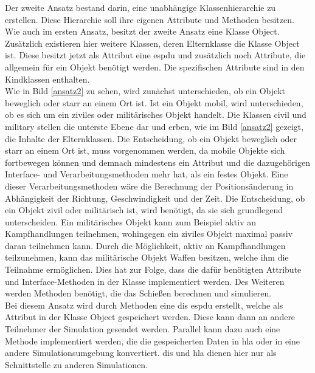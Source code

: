 Der zweite Ansatz bestand darin, eine unabhängige Klassenhierarchie zu erstellen. Diese Hierarchie soll ihre eigenen Attribute und Methoden besitzen. Wie auch im ersten Ansatz, besitzt der zweite Ansatz eine Klasse \glqq Object\grqq{}. Zusätzlich existieren hier weitere Klassen, deren Elternklasse die Klasse \glqq Object\grqq{} ist. Diese besitzt jetzt als Attribut eine \ac{espdu} und zusätzlich noch Attribute, die allgemein für ein Objekt benötigt werden. Die spezifischen Attribute sind  in den  Kindklassen enthalten. \\  Wie in Bild \ref{ansatz2} zu sehen, wird zunächst unterschieden, ob ein Objekt beweglich oder starr an einem Ort ist. Ist ein Objekt mobil, wird unterschieden, ob es sich um ein ziviles oder militärisches Objekt handelt. Die Klassen \glqq civil\grqq{} und \glqq military\grqq{} stellen die unterste Ebene dar und erben, wie im Bild \ref{ansatz2} gezeigt, die Inhalte der Elternklassen. Die Entscheidung, ob ein Objekt beweglich oder starr an einem Ort ist, muss vorgenommen werden, da mobile Objekte sich fortbewegen können und demnach mindestens ein Attribut und die dazugehörigen Interface- und Verarbeitungsmethoden mehr hat, als ein festes Objekt. Eine dieser  Verarbeitungsmethoden wäre die Berechnung der Positionsänderung in Abhängigkeit der Richtung, Geschwindigkeit und der Zeit. Die Entscheidung, ob ein Objekt zivil oder militärisch ist, wird benötigt, da sie sich grundlegend unterscheiden. Ein militärisches Objekt kann zum Beispiel aktiv an Kampfhandlungen teilnehmen, wohingegen ein ziviles Objekt maximal passiv daran teilnehmen kann. Durch die  Möglichkeit, aktiv an Kampfhandlungen teilzunehmen, kann das militärische Objekt Waffen besitzen, welche ihm die Teilnahme ermöglichen. Dies hat zur Folge, dass die dafür benötigten Attribute und Interface-Methoden in der Klasse implementiert werden. Des Weiteren werden Methoden benötigt, die das Schießen berechnen und simulieren. \\
Bei diesem Ansatz wird durch Methoden eine \ac{dis} \acl{espdu} erstellt, welche als Attribut in der Klasse \glqq Object\grqq{} gespeichert werden. Diese kann dann an andere Teilnehmer der Simulation gesendet werden. Parallel kann dazu auch eine Methode implementiert werden, die die gespeicherten Daten in \ac{hla} oder in eine andere Simulationsumgebung  konvertiert. \ac{dis} und \ac{hla} dienen hier nur als Schnittstelle zu anderen Simulationen. 
